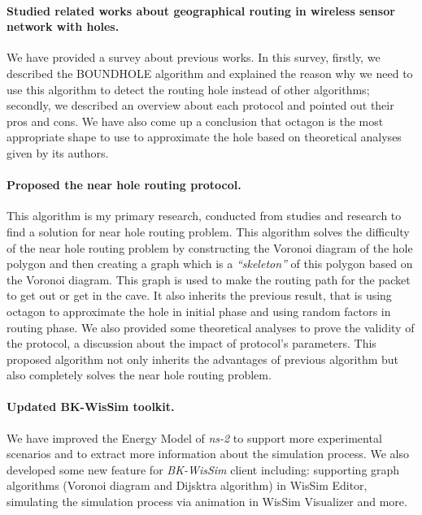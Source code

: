 \paragraph{Studied related works about geographical routing in wireless sensor network with holes. \\}
We have provided a survey about previous works. In this survey, firstly, we described the BOUNDHOLE algorithm and explained the reason why we need to use this algorithm to detect the routing hole instead of other algorithms; secondly, we described an overview about each protocol and pointed out their pros and cons. We have also come up a conclusion that octagon is the most appropriate shape to use to approximate the hole based on theoretical analyses given by its authors.

\paragraph{Proposed the near hole routing protocol.\\}
This algorithm is my primary research, conducted from studies and research to find a solution for near hole routing problem. This algorithm solves the difficulty of the near hole routing problem by constructing the Voronoi diagram \cite{voronoi} of the hole polygon and then creating a graph which is a \emph{``skeleton''} of this polygon based on the Voronoi diagram. This graph is used to make the routing path for the packet to get out or get in the cave. It also inherits the previous result, that is using octagon to approximate the hole in initial phase and using random factors in routing phase. We also provided some theoretical analyses to prove the validity of the protocol, a discussion about the impact of protocol's parameters. This proposed algorithm not only inherits the advantages of previous algorithm but also completely solves the near hole routing problem.

\paragraph{Updated BK-WisSim toolkit.\\}
We have improved the Energy Model of \emph{ns-2} to support more experimental scenarios and to extract more information about the simulation process. We also developed some new feature for \emph{BK-WisSim} client including: supporting graph algorithms (Voronoi diagram and Dijsktra algorithm) in WisSim Editor, simulating the simulation process via animation in WisSim Visualizer and more. 

